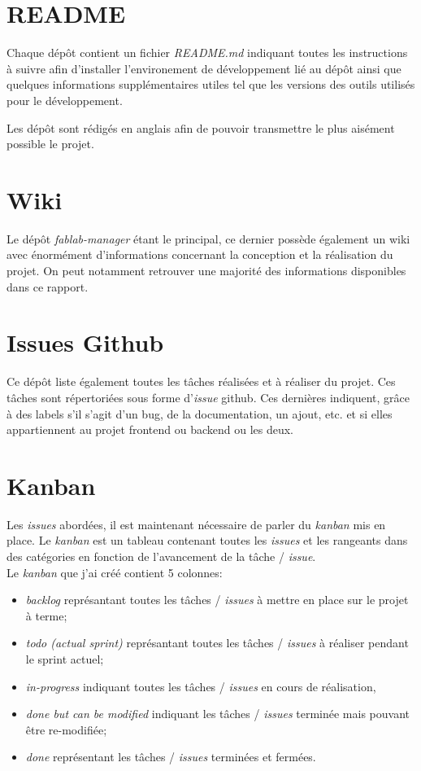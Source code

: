 \documentclass[
    iai, %
    il, %
]{heig-tb}
\begin{document}
\section{README}
Chaque dépôt contient un fichier \emph{README.md} indiquant toutes les instructions à suivre afin d'installer l'environement de développement lié au dépôt ainsi que quelques informations supplémentaires utiles tel que les versions des outils utilisés pour le développement.

Les dépôt sont rédigés en anglais afin de pouvoir transmettre le plus aisément possible le projet.

\section{Wiki}
Le dépôt \emph{fablab-manager} étant le principal, ce dernier possède également un wiki avec énormément d'informations concernant la conception et la réalisation du projet. On peut notamment retrouver une majorité des informations disponibles dans ce rapport.

\section{Issues Github}
Ce dépôt liste également toutes les tâches réalisées et à réaliser du projet. Ces tâches sont répertoriées sous forme d'\emph{issue} \Gls{github}. Ces dernières indiquent, grâce à des labels s'il s'agit d'un bug, de la documentation, un ajout, etc. et si elles appartiennent au projet \Gls {frontend} ou \Gls{backend} ou les deux.

\section{Kanban}
Les \emph{issues} abordées, il est maintenant nécessaire de parler du \emph{kanban} mis en place. Le \emph{kanban} est un tableau contenant toutes les \emph{issues} et les rangeants dans des catégories en fonction de l'avancement de la tâche / \emph{issue}. \\
Le \emph{kanban} que j'ai créé contient 5 colonnes:
\begin{itemize}
    \item \emph{backlog} représantant toutes les tâches / \emph{issues} à mettre en place sur le projet à terme;
    \item \emph{todo (actual sprint)} représantant toutes les tâches / \emph{issues} à réaliser pendant le sprint actuel;
    \item \emph{in-progress} indiquant toutes les tâches / \emph{issues} en cours de réalisation,
    \item \emph{done but can be modified} indiquant les tâches / \emph{issues} terminée mais pouvant être re-modifiée;
    \item \emph{done} représentant les tâches / \emph{issues} terminées et fermées.
\end{itemize}
\end{document}
